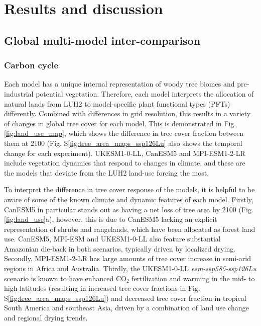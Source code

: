 \documentclass[]{article}
\begin{document}
\section{Results and discussion}

\subsection{Global multi-model inter-comparison}

\subsubsection{Carbon cycle}

Each model has a unique internal representation of woody tree biomes and pre-industrial potential vegetation.
Therefore, each model interprets the allocation of natural lands from LUH2 to model-specific plant functional types (PFTs) differently.
Combined with differences in grid resolution, this results in a variety of changes in global tree cover for each model. This is demonstrated in Fig. \ref{fig:land_use_map}, which shows the difference in tree cover fraction between them at 2100 (Fig. S\ref{fig:tree_area_maps_ssp126Lu} also shows the temporal change for each experiment).
UKESM1-0-LL, CanESM5 and MPI-ESM1-2-LR include vegetation dynamics that respond to changes in climate, and these are the models that deviate from the LUH2 land-use forcing the most.

To interpret the difference in tree cover response of the models, it is helpful to be aware of some of the known climate and dynamic features of each model.
Firstly, CanESM5 in particular stands out as having a net loss of tree area by 2100 (Fig. \ref{fig:land_use}a), however, this is due to CanESM5 lacking an explicit representation of shrubs and rangelands, which have been allocated as forest land use.
CanESM5, MPI-ESM and UKESM1-0-LL also feature substantial Amazonian die-back in both scenarios, typically driven by localized drying.
Secondly, MPI-ESM1-2-LR has large amounts of tree cover increase in semi-arid regions in Africa and Australia.
Thirdly, the UKESM1-0-LL \textit{esm-ssp585-ssp126Lu} scenario is known to have enhanced CO$_2$ fertilization and warming in the mid- to high-latitudes (resulting in increased tree cover fractions in Fig. S\ref{fig:tree_area_maps_ssp126Lu}) and decreased tree cover fraction in tropical South America and southeast Asia, driven by a combination of land use change and regional drying trends.
\end{document}
